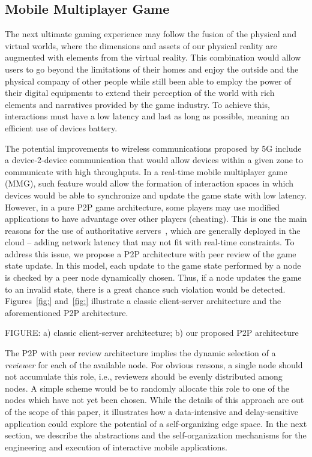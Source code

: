 \subsection{Mobile Multiplayer Game}

The next ultimate gaming experience may follow the fusion of the physical and virtual worlds, where the dimensions and assets of our physical reality are augmented with elements from the virtual reality. This combination would allow users to go beyond the limitations of their homes and enjoy the outside and the physical company of other people while still been able to employ the power of their digital equipments to extend their perception of the world with rich elements and narratives provided by the game industry. To achieve this, interactions must have a low latency and last as long as possible, meaning an efficient use of devices battery.

The potential improvements to wireless communications proposed by 5G include a device-2-device communication that would allow devices within a given zone to communicate with high throughputs. In a real-time mobile multiplayer game (MMG), such feature would allow the formation of interaction spaces in which devices would be able to synchronize and update the game state with low latency. However, in a pure P2P game architecture, some players may use modified applications to have advantage over other players (cheating). This is one the main reasons for the use of authoritative servers~\cite{}, which are generally deployed in the cloud -- adding network latency that may not fit with real-time constraints. To address this issue, we propose a P2P architecture with peer review of the game state update. In this model, each update to the game state performed by a node is checked by a peer node dynamically chosen. Thus, if a node updates the game to an invalid state, there is a great chance such violation would be detected. Figures~\ref{fig:} and~\ref{fig:} illustrate a classic client-server architecture and the aforementioned P2P architecture.

FIGURE: a) classic client-server architecture; b) our proposed P2P architecture

The P2P with peer review architecture implies the dynamic selection of a \textit{reviewer} for each of the available node. For obvious reasons, a single node should not accumulate this role, i.e., reviewers should be evenly distributed among nodes. A simple scheme would be to randomly allocate this role to one of the nodes which have not yet been chosen. While the details of this approach are out of the scope of this paper, it illustrates how a data-intensive and delay-sensitive application could explore the potential of a self-organizing edge space. In the next section, we describe the abstractions and the self-organization mechanisms for the engineering and execution of interactive mobile applications.


